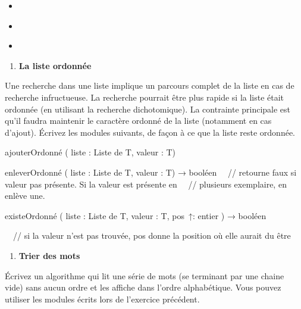 {
}

\liststyleListv
\begin{itemize}
\item {
}
\item {
}
\item {
}
\end{itemize}
\liststyleExercice
\begin{enumerate}
\item {\sffamily\bfseries
La liste ordonnée}
\end{enumerate}
{
Une recherche dans une liste implique un parcours complet de la liste en
cas de recherche infructueuse. La recherche pourrait être plus rapide
si la liste était ordonnée (en utilisant la recherche dichotomique). La
contrainte principale est qu'il faudra maintenir le
caractère ordonné de la liste (notamment en cas
d'ajout). Écrivez les modules suivants, de façon à ce
que la liste reste ordonnée.}

{\sffamily
{} ajouterOrdonné ( liste : Liste de T,
valeur : T)}

{\sffamily
{} enleverOrdonné ( liste : Liste de T,
valeur : T) → booléen
\ \ // retourne faux si valeur pas présente. Si la valeur est présente
en
\ \ // plusieurs exemplaire, en enlève une.}

{\sffamily
{} existeOrdonné ( liste : Liste de T,
valeur : T, pos~↑: entier ) → booléen}

{\sffamily
\ \ // si la valeur n'est pas trouvée, pos donne la
position où elle aurait du être}

\liststyleExercice
\setcounter{saveenum}{\value{enumi}}
\begin{enumerate}
\setcounter{enumi}{\value{saveenum}}
\item {\sffamily\bfseries
Trier des mots}
\end{enumerate}
{
Écrivez un algorithme qui lit une série de mots (se terminant par une
chaine vide) sans aucun ordre et les affiche dans l’ordre alphabétique.
Vous pouvez utiliser les modules écrits lors de
l'exercice précédent.}

